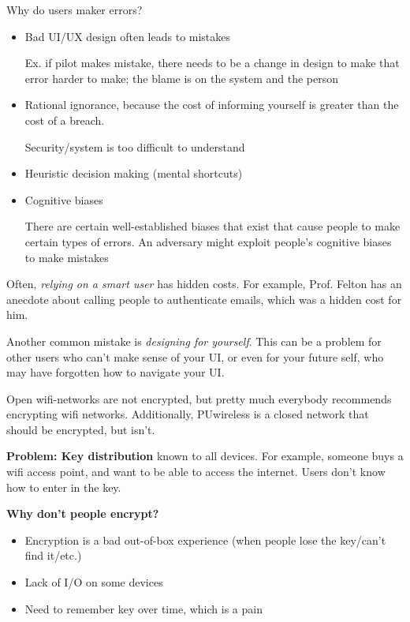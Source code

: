 
Why do users maker errors?
\begin{itemize}
	\item Bad UI/UX design often leads to mistakes

		Ex. if pilot makes mistake, there needs to be a change in design to make that error harder to make; the blame is on the system and the person
	\item Rational ignorance, because the cost of informing yourself is greater than 	the cost of a breach. 

		Security/system is too difficult to understand
	\item Heuristic decision making (mental shortcuts)
	\item Cognitive biases

		There are certain well-established biases that exist that cause people to make certain types of errors. An adversary might exploit people's cognitive biases to make mistakes
\end{itemize}

Often, \textit{relying on a smart user} has hidden costs. For example, Prof. Felton has an anecdote about calling people to authenticate emails, which was a hidden cost for him.

Another common mistake is \textit{designing for yourself}. This can be a problem for other users who can't make sense of your UI, or even for your future self, who may have forgotten how to navigate your UI.

Open wifi-networks are not encrypted, but pretty much everybody recommends encrypting wifi networks. Additionally, PUwireless is a closed network that should be encrypted, but isn't.

\textbf{Problem: Key distribution} known to all devices. For example, someone buys a wifi access point, and want to be able to access the internet. Users don't know how to enter in the key.

\textbf{Why don't people encrypt?}
\begin{itemize}
	\item Encryption is a bad out-of-box experience (when people lose the key/can't find it/etc.)
	\item Lack of I/O on some devices 
	\item Need to remember key over time, which is a pain
\end{itemize}

